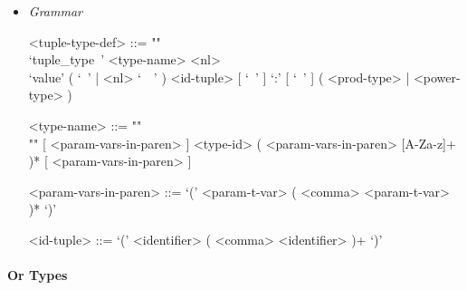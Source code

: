 \documentclass{article}
\begin{document}
\begin{itemize}
\item \textit{Grammar}

\begin{grammar}
<tuple-type-def> ::= ""\\
`tuple_type\ ' <type-name> <nl> \\
`value' ( `\ ' | <nl> `\ \ ' )
<id-tuple> [ `\ ' ] `:' [ `\ ' ] ( <prod-type> | <power-type> )

<type-name> ::= ""\\""
[ <param-vars-in-paren> ] <type-id> ( <param-vars-in-paren> [A-Za-z]+ )*
[ <param-vars-in-paren> ]

<param-vars-in-paren> ::= `(' <param-t-var> ( <comma> <param-t-var> )* `)'

<id-tuple> ::= `(' <identifier> ( <comma> <identifier> )+ `)'
\end{grammar}

\end{itemize}

\paragraph{Or Types}
\end{document}
